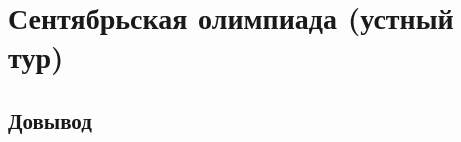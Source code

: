 










\begingroup

\providecommand\ifpreupsurge{\iftrue}
\providecommand\ifupsurge{\iftrue}

\providecommand\ifolympiadsolutions{\iffalse}

\newcommand\olympiadsolution[1]{\ifolympiadsolutions#1\fi}

\section*{Сентябрьская олимпиада (устный тур)}

\olympiadsolution{\subsection*{с решениями}}

\ifpreupsurge
\subsection*{Довывод}

